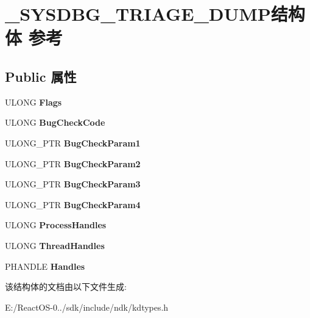 \hypertarget{struct___s_y_s_d_b_g___t_r_i_a_g_e___d_u_m_p}{}\section{\+\_\+\+S\+Y\+S\+D\+B\+G\+\_\+\+T\+R\+I\+A\+G\+E\+\_\+\+D\+U\+M\+P结构体 参考}
\label{struct___s_y_s_d_b_g___t_r_i_a_g_e___d_u_m_p}
\subsection*{Public 属性}
\begin{DoxyCompactItemize}
\item 
\mbox{\label{struct___s_y_s_d_b_g___t_r_i_a_g_e___d_u_m_p_a7b785f8fc56aac68f82f79b30a8c4d83}} 
U\+L\+O\+NG {\bfseries Flags}
\item 
\mbox{\label{struct___s_y_s_d_b_g___t_r_i_a_g_e___d_u_m_p_ac47328cd8fb2e0b0fde6c924ec8651a8}} 
U\+L\+O\+NG {\bfseries Bug\+Check\+Code}
\item 
\mbox{\label{struct___s_y_s_d_b_g___t_r_i_a_g_e___d_u_m_p_a6db37c1ce689b5e6f7d39291d0e6e982}} 
U\+L\+O\+N\+G\+\_\+\+P\+TR {\bfseries Bug\+Check\+Param1}
\item 
\mbox{\label{struct___s_y_s_d_b_g___t_r_i_a_g_e___d_u_m_p_a2d048ca9636530e1a57610564af3979b}} 
U\+L\+O\+N\+G\+\_\+\+P\+TR {\bfseries Bug\+Check\+Param2}
\item 
\mbox{\label{struct___s_y_s_d_b_g___t_r_i_a_g_e___d_u_m_p_a69e2a922566ce15e6d23fba779e4e178}} 
U\+L\+O\+N\+G\+\_\+\+P\+TR {\bfseries Bug\+Check\+Param3}
\item 
\mbox{\label{struct___s_y_s_d_b_g___t_r_i_a_g_e___d_u_m_p_a88f74aeaaab90723e75afc05fba50be0}} 
U\+L\+O\+N\+G\+\_\+\+P\+TR {\bfseries Bug\+Check\+Param4}
\item 
\mbox{\label{struct___s_y_s_d_b_g___t_r_i_a_g_e___d_u_m_p_a3407d6827a21bb7ca298da0b37196a47}} 
U\+L\+O\+NG {\bfseries Process\+Handles}
\item 
\mbox{\label{struct___s_y_s_d_b_g___t_r_i_a_g_e___d_u_m_p_af67f79e6bb3f2132269e64ec8c2b0c98}} 
U\+L\+O\+NG {\bfseries Thread\+Handles}
\item 
\mbox{\label{struct___s_y_s_d_b_g___t_r_i_a_g_e___d_u_m_p_a0ee0f166a7a6dbb02106617cb18ed7ec}} 
P\+H\+A\+N\+D\+LE {\bfseries Handles}
\end{DoxyCompactItemize}


该结构体的文档由以下文件生成\+:\begin{DoxyCompactItemize}
\item 
E\+:/\+React\+O\+S-\/0../sdk/include/ndk/kdtypes.\+h\end{DoxyCompactItemize}
